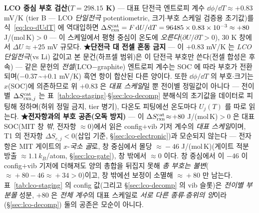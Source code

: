 \begin{verifybox}
\textbf{LCO 중심 부호 검산($T=298.15$ K)} --- 대표 단전극 엔트로피 계수 $\dd\phi/\dd T\approx+0.83$ mV/K\cite{swiderska2019}
(tier B --- LCO \emph{단일전극} potentiometric, 크기$\cdot$부호 스케일 검증용 초기값)를 식~\eqref{eq:lco-dUdT}
에 역대입하면 $\Delta S_{\mathrm{rxn}}^\mathrm{cat}=F\,\mathrm{d} U/\mathrm{d} T=96485\times0.83\times10^{-3}\approx+80$ J/(mol\,K)$>0$ ---
이 스케일에서 평형 중심이 온도에 \emph{오른다}($\partial U/\partial T>0$), $30$ K 창에서 $\Delta U\approx+25$ mV 규모다.
\textbf{★단전극 대 전셀 혼동 금지} --- 이 $+0.83$ mV/K 는 \emph{LCO 단일전극}(vs Li) 값이고 본 문건(하프셀
범위)은 이 단전극 부호만 쓴다(전셀 합성은 후속) --- 같은 문헌의 \emph{전셀}(LCO$-$graphite) 엔트로피 계수는
SOC 에 따라 부호가 전환되며($-0.37$\,\textasciitilde$+0.1$ mV/K) 흑연 항이 합산된 다른 양이다. 또한
$\dd\phi/\dd T$ 의 부호$\cdot$크기는 $x$(SOC)에 의존하므로 위 $+0.83$ 은 \emph{대표 스케일}일 뿐 전이별
정밀값이 아니다 --- 전이별 $\Delta S_{\mathrm{rxn},j}^\mathrm{cat}$ 는 표~\ref{tab:lco-staging}$\cdot$\S\ref{sec:lco-decomp}
분해식의 초기값을 데이터로 피팅해 정하며(허위 정밀 금지, tier 병기), 다온도 피팅에선 온도마다 $U_j(T)$ 를 따로 읽는다.
\textbf{★전자항과의 부호 공존(오독 방지)} --- 이 $\Delta S_{\mathrm{rxn}}^\mathrm{cat}\!\approx\!+80$ J/(mol\,K)$>0$ 은
대표 SOC(MIT 창 \emph{밖}, 전자항 $\approx\!0$)에서 읽은 config$+$vib 기저 계수의 \emph{대표 스케일}이며,
T1 의 전자항 $\Delta S_{e,j}<0$(삽입 기준, \S\ref{sec:lco-electronic})과 모순되지 않는다 --- 전자항은 MIT 게이트의
$x$-\emph{국소 골}로, 창 중심에서 몰당 $\approx\!-46$ J/(mol\,K)(게이트 적분 방출 $\approx\!1.1\,k_B$/atom,
\S\ref{sec:lco-gate}), 창 밖에서 $\approx\!0$ 이다. 창 중심에서 이 $-46$ 이 config$+$vib 기저에 더해져도 양의 총합을
뒤집지 못해 \emph{총 부호는 불변}($\approx\!+80-46\approx\!+34>0$)이고, 창 밖에선 보정이 소멸해 $\approx\!+80$ 만 남는다. 표~\ref{tab:lco-staging}
의 config 값(그리고 \S\ref{sec:lco-decomp} 의 vib 슬롯)은 \emph{전이별 부분몰} 성분, $+80$ 은 \emph{전체 계수}의 대표 스케일로 \emph{서로 다른
종류$\cdot$층위의 양}이라(\S\ref{sec:lco-decomp}) 둘의 공존은 모순이 아니다.
\end{verifybox}

